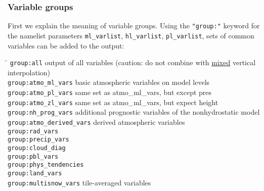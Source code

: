 \subsubsection{Variable groups}
First we explain the meaning of variable groups.
Using the \texttt{"group:"} keyword for the namelist parameters \texttt{ml\_varlist}, \texttt{hl\_varlist}, \texttt{pl\_varlist},
sets of common variables can be added to the output:
\begin{tabbing}
\hspace*{0.4\textwidth} \= \kill
\texttt{group:all}                     \>      output of all variables (caution: do not combine with \underline{mixed} vertical interpolation) \\
\texttt{group:atmo\_ml\_vars}          \>      basic atmospheric variables on model levels                          \\
\texttt{group:atmo\_pl\_vars}          \>      same set as atmo\_ml\_vars, but except pres\\
\texttt{group:atmo\_zl\_vars}          \>      same set as atmo\_ml\_vars, but expect height\\
\texttt{group:nh\_prog\_vars}          \>      additional prognostic variables of the nonhydrostatic model          \\
\texttt{group:atmo\_derived\_vars}     \>      derived atmospheric variables                                        \\
\texttt{group:rad\_vars}               \>                                                                           \\
\texttt{group:precip\_vars}            \>                                                                           \\
\texttt{group:cloud\_diag}             \>                                                                           \\
\texttt{group:pbl\_vars}               \>                                                                           \\
\texttt{group:phys\_tendencies}        \>                                                                           \\
\texttt{group:land\_vars}              \>                                                                           \\
\texttt{group:multisnow\_vars}         \>     tile-averaged variables
\end{tabbing}



